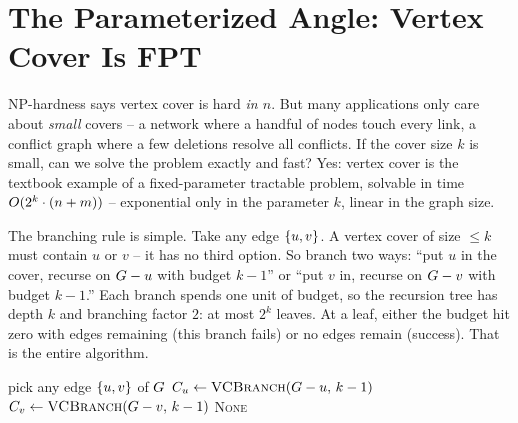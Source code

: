 \section{The Parameterized Angle: Vertex Cover Is FPT}
\label{ch29:fpt}

NP-hardness says vertex cover is hard \emph{in $n$}. But many applications only
care about \emph{small} covers -- a network where a handful of nodes touch every
link, a conflict graph where a few deletions resolve all conflicts. If the cover
size $k$ is small, can we solve the problem exactly and fast? Yes: vertex cover
is the textbook example of a fixed-parameter tractable problem, solvable in time
$O(2^k\cdot (n+m))$ -- exponential only in the parameter $k$, linear in the
graph size.

\begin{intuitionbox}
The branching rule is simple. Take any edge $\{u,v\}$. A vertex
cover of size $\le k$ must contain $u$ or $v$ -- it has no third option. So
branch two ways: ``put $u$ in the cover, recurse on $G-u$ with budget $k-1$''
or ``put $v$ in, recurse on $G-v$ with budget $k-1$.'' Each branch spends one
unit of budget, so the recursion tree has depth $k$ and branching factor $2$: at
most $2^k$ leaves. At a leaf, either the budget hit zero with edges remaining
(this branch fails) or no edges remain (success). That is the entire algorithm.
\end{intuitionbox}

\begin{algorithm}[H]
\caption{\textsc{VCBranch}$(\Gph,k)$ -- decide vertex cover $\le k$}
\label{ch29:alg-vcbranch}
\DontPrintSemicolon
{}
pick any edge $\{u,v\}$ of $G$\;
$C_u\leftarrow\textsc{VCBranch}(G-u,\,k-1)$\;
$C_v\leftarrow\textsc{VCBranch}(G-v,\,k-1)$\;
\Return \textsc{None}\;
\end{algorithm}

